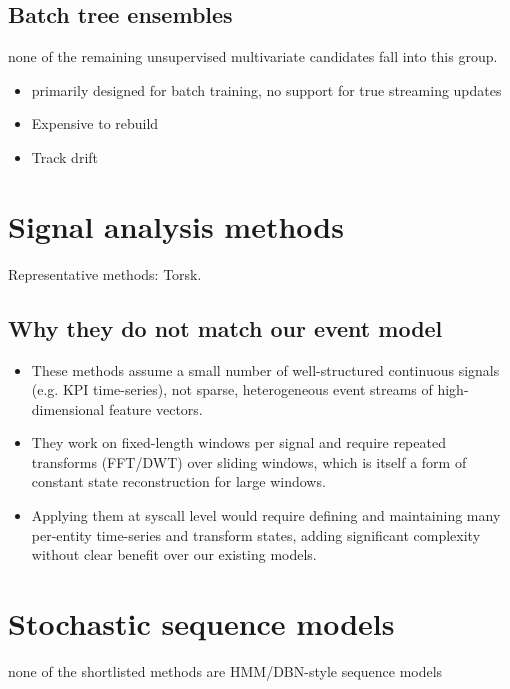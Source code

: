 \documentclass[a4paper,11pt]{article}
\begin{document}
\subsection*{Batch tree ensembles}
none of the remaining unsupervised multivariate candidates fall into this group.
\begin{itemize}
  \item primarily designed for batch training, no support for true streaming updates
  \item Expensive to rebuild
  \item Track drift
\end{itemize}


\section{Signal analysis methods}
Representative methods: Torsk.

\subsection*{Why they do not match our event model}
\begin{itemize}
  \item These methods assume a small number of well-structured continuous signals (e.g. KPI time-series), not sparse, heterogeneous event streams of high-dimensional feature vectors.
  \item They work on fixed-length windows per signal and require repeated transforms (FFT/DWT) over sliding windows, which is itself a form of constant state reconstruction for large windows.
  \item Applying them at syscall level would require defining and maintaining many per-entity time-series and transform states, adding significant complexity without clear benefit over our existing models.
\end{itemize}


\section{Stochastic sequence models}
none of the shortlisted methods are HMM/DBN-style sequence models
\end{document}
